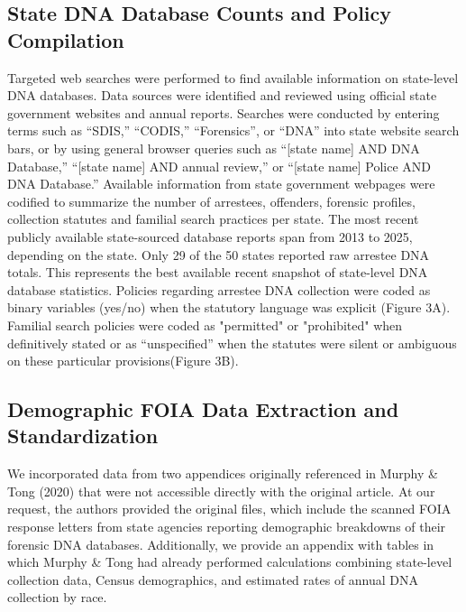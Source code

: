 \documentclass[11pt]{article}
\begin{document}
\subsection*{State DNA Database Counts and Policy Compilation}
Targeted web searches were performed to find available information on state-level DNA databases. Data sources were identified and reviewed using official state government websites and annual reports. Searches were conducted by entering terms such as ``SDIS,'' ``CODIS,'' ``Forensics'', or ``DNA'' into state website search bars, or by using general browser queries such as ``[state name] AND DNA Database,'' ``[state name] AND annual review,'' or ``[state name] Police AND DNA Database.'' Available information from state government webpages were codified to summarize the number of arrestees, offenders, forensic profiles, collection statutes and familial search practices per state. The most recent publicly available state-sourced database reports span from 2013 to 2025, depending on the state. Only 29 of the 50 states reported raw arrestee DNA totals. This represents the best available recent snapshot of state-level DNA database statistics. Policies regarding arrestee DNA collection were coded as binary variables (yes/no) when the statutory language was explicit (Figure 3A). Familial search policies were coded as "permitted" or "prohibited" when definitively stated or as ``unspecified'' when the statutes were silent or ambiguous on these particular provisions(Figure 3B).

\subsection*{Demographic FOIA Data Extraction and Standardization}

We incorporated data from two appendices originally referenced in Murphy \& Tong (2020) that were not accessible directly with the original article. At our request, the authors provided the original files, which include the scanned FOIA response letters from state agencies reporting demographic breakdowns of their forensic DNA databases. Additionally, we provide an appendix with tables in which Murphy \& Tong had already performed calculations combining state-level collection data, Census demographics, and estimated rates of annual DNA collection by race.
\end{document}
